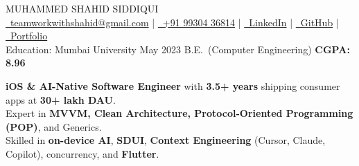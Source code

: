 \documentclass[letterpaper,11pt]{article}
\begin{document}
\begin{center}
    {\Huge \scshape MUHAMMED SHAHID SIDDIQUI} \\[4pt]
    \normalsize
    \href{mailto:teamworkwithshahid@gmail.com}{\raisebox{-0.2\height}\faEnvelope\ teamworkwithshahid@gmail.com}
    \;|\;
    \href{tel:+919930436814}{\raisebox{-0.2\height}\faPhone\ +91 99304 36814}
    \;|\;
    \href{https://www.linkedin.com/in/shahid-siddiqui-25931b197/}{\raisebox{-0.2\height}\faLinkedin\ LinkedIn}
    \;|\;
    \href{https://github.com/Siddiqui-Shahid}{\raisebox{-0.2\height}\faGithub\ GitHub}
    \;|\;
    \href{https://siddiqui-shahid.github.io/MyWebsite/}{\raisebox{-0.2\height}\faGlobe\ Portfolio}
    \\[2pt]
    Education: Mumbai University \textemdash{} May 2023 \textemdash{} B.E.\ (Computer Engineering) \textemdash{} \textbf{CGPA: 8.96}
\end{center}

\vspace{3pt}
\noindent\textbf{iOS \& AI-Native Software Engineer} with \textbf{3.5+ years} shipping consumer apps at \textbf{30+ lakh DAU}.\\
Expert in \textbf{MVVM, Clean Architecture, Protocol-Oriented Programming (POP)}, and Generics.\\
Skilled in \textbf{on-device AI}, \textbf{SDUI}, \textbf{Context Engineering} (Cursor, Claude, Copilot), concurrency, and \textbf{Flutter}.
\end{document}
